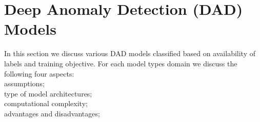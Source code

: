 \section{Deep Anomaly Detection (DAD) Models}
\label{sec:deepDADModels}

In this section we discuss various DAD models classified  based on availability of labels and training objective. For each model types domain we discuss the following four aspects:\\
\textemdash assumptions;\\
\textemdash type of model architectures;\\
\textemdash computational complexity;\\
\textemdash advantages and disadvantages;\\


\label{sec:supervised}


\label{sec:semiSupervised}


\label{sec:hybrid}


\label{sec:oneClassNeuralNetworks}


\label{sec:unsupervised}


\label{sec:others}
